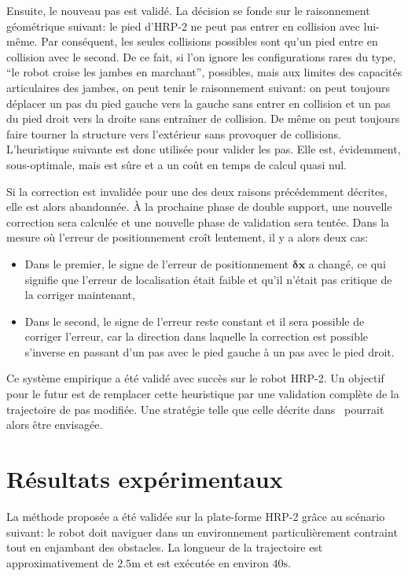 Ensuite, le nouveau pas est validé. La décision se fonde sur le
raisonnement géométrique suivant: le pied d'HRP-2 ne peut pas entrer
en collision avec lui-même. Par conséquent, les seules collisions
possibles sont qu'un pied entre en collision avec le second. De ce
fait, si l'on ignore les configurations rares du type, ``le robot
croise les jambes en marchant'', possibles, mais aux limites des
capacités articulaires des jambes, on peut tenir le raisonnement
suivant: on peut toujours déplacer un pas du pied gauche vers la
gauche sans entrer en collision et un pas du pied droit vers la droite
sans entraîner de collision. De même on peut toujours faire tourner la
structure vers l'extérieur sans provoquer de collisions. L'heuristique
suivante est donc utilisée pour valider les pas. Elle est, évidemment,
sous-optimale, mais est sûre et a un coût en temps de calcul quasi
nul.


Si la correction est invalidée pour une des deux raisons précédemment
décrites, elle est alors abandonnée. À la prochaine phase de double
support, une nouvelle correction sera calculée et une nouvelle phase
de validation sera tentée. Dans la mesure où l'erreur de
positionnement croît lentement, il y a alors deux cas:
\begin{itemize}
\item Dans le premier, le signe de l'erreur de positionnement
  $\mathbf{\delta {x}}$ a changé, ce qui signifie que l'erreur de
  localisation était faible et qu'il n'était pas critique de la
  corriger maintenant,
\item Dans le second, le signe de l'erreur reste constant et il sera
  possible de corriger l'erreur, car la direction dans laquelle la
  correction est possible s'inverse en passant d'un pas avec le pied
  gauche à un pas avec le pied droit.
\end{itemize}

Ce système empirique a été validé avec succès sur le robot HRP-2. Un
objectif pour le futur est de remplacer cette heuristique par une
validation complète de la trajectoire de pas modifiée. Une stratégie
telle que celle décrite dans \cite{10perrin.icra} pourrait alors être
envisagée.

\section{Résultats expérimentaux}\label{exp}


La méthode proposée a été validée sur la plate-forme
HRP-2 grâce au scénario suivant: le robot doit naviguer
dans un environnement particulièrement contraint tout en enjambant des
obstacles. La longueur de la trajectoire est approximativement de
$2.5\mathrm{m}$ et est exécutée en environ $40\mathrm{s}$.


